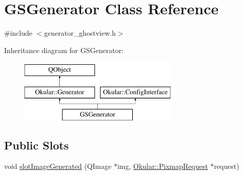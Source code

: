 \hypertarget{classGSGenerator}{\section{G\+S\+Generator Class Reference}
\label{classGSGenerator}
}


{\ttfamily \#include $<$generator\+\_\+ghostview.\+h$>$}

Inheritance diagram for G\+S\+Generator\+:\begin{figure}[H]
\begin{center}
\leavevmode
\includegraphics[height=3.000000cm]{classGSGenerator}
\end{center}
\end{figure}
\subsection*{Public Slots}
\begin{DoxyCompactItemize}
\item 
void \hyperlink{classGSGenerator_a3257ce78fcdb8f1878637f6a5682bbc3}{slot\+Image\+Generated} (Q\+Image $\ast$img, \hyperlink{classOkular_1_1PixmapRequest}{Okular\+::\+Pixmap\+Request} $\ast$request)
\end{DoxyCompactItemize}
